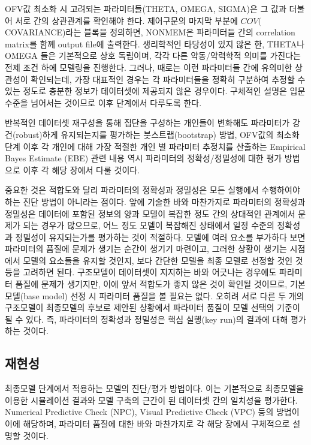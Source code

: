 \documentclass[
  10pt,
  krantz2,
  a4paper]{krantz}
\theoremstyle{definition}
\theoremstyle{definition}
\theoremstyle{definition}
\theoremstyle{remark}
\begin{document}
OFV값 최소화 시 고려되는 파라미터들(THETA, OMEGA, SIGMA)은 그 값과 더불어 서로 간의 상관관계를 확인해야 한다. 제어구문의 마지막 부분에 \(COV(\)COVARIANCE)라는 블록을 정의하면, NONMEM은 파라미터들 간의 correlation matrix를 함께 output file에 출력한다. 생리학적인 타당성이 있지 않은 한, THETA나 OMEGA 들은 기본적으로 상호 독립이며, 각각 다른 약동/약력학적 의미를 가진다는 전제 조건 하에 모델링을 진행한다. 그러나, 때로는 이런 파라미터들 간에 유의미한 상관성이 확인되는데, 가장 대표적인 경우는 각 파라미터들을 정확히 구분하여 추정할 수 있는 정도로 충분한 정보가 데이터셋에 제공되지 않은 경우이다. 구체적인 설명은 입문 수준을 넘어서는 것이므로 이후 단계에서 다루도록 한다.

반복적인 데이터셋 재구성을 통해 집단을 구성하는 개인들이 변화해도 파라미터가 강건(robust)하게 유지되는지를 평가하는 붓스트랩(bootstrap) 방법, OFV값의 최소화 단계 이후 각 개인에 대해 가장 적절한 개인 별 파라미터 추정치를 산출하는 Empirical Bayes Estimate (EBE) 관련 내용 역시 파라미터의 정확성/정밀성에 대한 평가 방법으로 이후 각 해당 장에서 다룰 것이다.

중요한 것은 적합도와 달리 파라미터의 정확성과 정밀성은 모든 실행에서 수행하여야 하는 진단 방법이 아니라는 점이다. 앞에 기술한 바와 마찬가지로 파라미터의 정확성과 정밀성은 데이터에 포함된 정보의 양과 모델이 복잡한 정도 간의 상대적인 관계에서 문제가 되는 경우가 많으므로, 어느 정도 모델이 복잡해진 상태에서 일정 수준의 정확성과 정밀성이 유지되는가를 평가하는 것이 적절하다. 모델에 여러 요소를 부가하다 보면 파라미터의 품질에 문제가 생기는 순간이 생기기 마련이고, 그러한 상황이 생기는 시점에서 모델의 요소들을 유지할 것인지, 보다 간단한 모델을 최종 모델로 선정할 것인 것 등을 고려하면 된다. 구조모델이 데이터셋이 지지하는 바와 어긋나는 경우에도 파라미터 품질에 문제가 생기지만, 이에 앞서 적합도가 좋지 않은 것이 확인될 것이므로, 기본모델(base model) 선정 시 파라미터 품질을 볼 필요는 없다. 오히려 서로 다른 두 개의 구조모델이 최종모델의 후보로 제안된 상황에서 파라미터 품질이 모델 선택의 기준이 될 수 있다. 즉, 파라미터의 정확성과 정밀성은 핵심 실행(key run)의 결과에 대해 평가하는 것이다.

\hypertarget{uxc7acuxd604uxc131}{%
\subsection{재현성}\label{uxc7acuxd604uxc131}}

최종모델 단계에서 적용하는 모델의 진단/평가 방법이다. 이는 기본적으로 최종모델을 이용한 시뮬레이션 결과와 모델 구축의 근간이 된 데이터셋 간의 일치성을 평가한다. Numerical Predictive Check (NPC), Visual Predictive Check (VPC) 등의 방법이 이에 해당하며, 파라미터 품질에 대한 바와 마찬가지로 각 해당 장에서 구체적으로 설명할 것이다.
\end{document}

